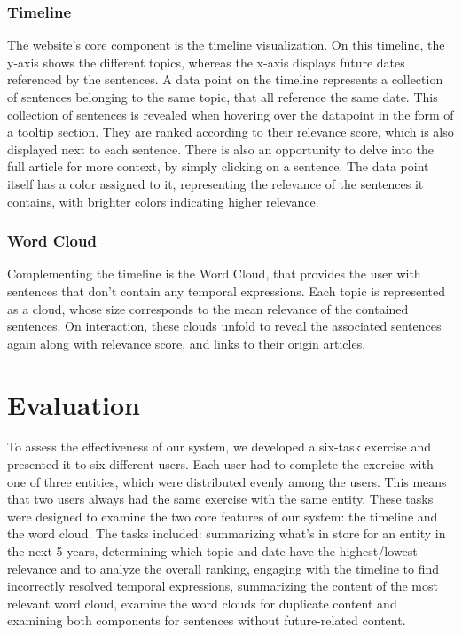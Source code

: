 \documentclass[10pt,twocolumn]{article}
\begin{document}
\subsubsection{Timeline}
The website's core component is the timeline visualization. On this timeline, the y-axis shows the different topics, whereas the x-axis displays future dates referenced by the sentences. A data point on the timeline represents a collection of sentences belonging to the same topic, that all reference the same date. This collection of sentences is revealed when hovering over the datapoint in the form of a tooltip section. They are ranked according to their relevance score, which is also displayed next to each sentence. There is also an opportunity to delve into the full article for more context, by simply clicking on a sentence. The data point itself has a color assigned to it, representing the relevance of the sentences it contains, with brighter colors indicating higher relevance.

\subsubsection{Word Cloud}
Complementing the timeline is the Word Cloud, that provides the user with sentences that don't contain any temporal expressions. Each topic is represented as a cloud, whose size corresponds to the mean relevance of the contained sentences. On interaction, these clouds unfold to reveal the associated sentences again along with relevance score, and links to their origin articles.


\section{Evaluation}
To assess the effectiveness of our system, we developed a six-task exercise and presented it to six different users. Each user had to complete the exercise with one of three entities, which were distributed evenly among the users. This means that two users always had the same exercise with the same entity.
These tasks were designed to examine the two core features of our system: the timeline and the word cloud. 
The tasks included: summarizing what's in store for an entity in the next 5 years, determining which topic and date have the highest/lowest relevance and to analyze the overall ranking, engaging with the timeline to find incorrectly resolved temporal expressions, summarizing the content of the most relevant word cloud, examine the word clouds for duplicate content and examining both components for sentences without future-related content.
\end{document}
